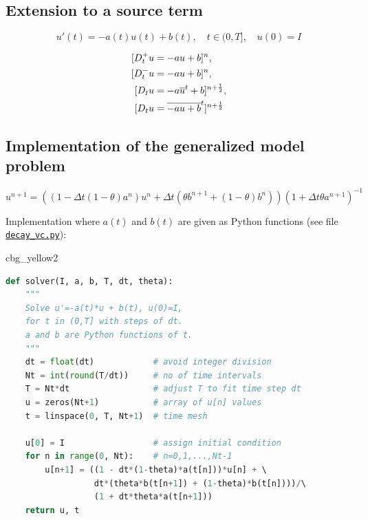 \documentclass[%
oneside,                 %
final,                   %
10pt]{article}
\newenvironment{_cod_tight}[1]{
   \def\FrameCommand{\colorbox{#1}}
   \FrameRule0.6pt\MakeFramed {\FrameRestore}\vskip3mm}
   {\vskip0mm\endMakeFramed}
\newenvironment{cod}[1]{
\bgroup\rmfamily
\fboxsep=0mm\relax
\begin{_cod_tight}{#1}
\list{}{\parsep=-2mm\parskip=0mm\topsep=0pt\leftmargin=2mm
\rightmargin=2\leftmargin\leftmargin=4pt\relax}
\item\relax}
{\endlist\end{_cod_tight}\egroup}
\begin{document}
\subsection*{Extension to a source term}
\label{decay:source}

\begin{equation}
u'(t) = -a(t)u(t) + b(t),\quad t\in (0,T],\quad u(0)=I
\label{decay:problem:ab}
\end{equation}

\begin{align*}
\lbrack D^+_t u &= -au + b\rbrack^n,\\ 
\lbrack D^-_t u &= -au + b\rbrack^n,\\ 
\lbrack D_t u   &= -a\overline{u}^t + b\rbrack^{n+\half},\\ 
\lbrack D_t u   &= \overline{-au+b}^t\rbrack^{n+\half}
\end{align*}

\subsection*{Implementation of the generalized model problem}
\label{decay:general}

\begin{equation}
u^{n+1} = ((1 - \Delta t(1-\theta)a^n)u^n
+ \Delta t(\theta b^{n+1} + (1-\theta)b^n))(1 + \Delta t\theta a^{n+1})^{-1}
\end{equation}

Implementation where $a(t)$ and $b(t)$ are given as
Python functions (see file \href{{http://tinyurl.com/ofkw6kc/genz/decay_vc.py}}{\nolinkurl{decay_vc.py}}):

\begin{cod}{cbg_yellow2}\begin{lstlisting}[language=Python,style=simple,xleftmargin=2mm]
def solver(I, a, b, T, dt, theta):
    """
    Solve u'=-a(t)*u + b(t), u(0)=I,
    for t in (0,T] with steps of dt.
    a and b are Python functions of t.
    """
    dt = float(dt)            # avoid integer division
    Nt = int(round(T/dt))     # no of time intervals
    T = Nt*dt                 # adjust T to fit time step dt
    u = zeros(Nt+1)           # array of u[n] values
    t = linspace(0, T, Nt+1)  # time mesh

    u[0] = I                  # assign initial condition
    for n in range(0, Nt):    # n=0,1,...,Nt-1
        u[n+1] = ((1 - dt*(1-theta)*a(t[n]))*u[n] + \ 
                  dt*(theta*b(t[n+1]) + (1-theta)*b(t[n])))/\ 
                  (1 + dt*theta*a(t[n+1]))
    return u, t
\end{lstlisting}\end{cod}
\noindent
\end{document}
